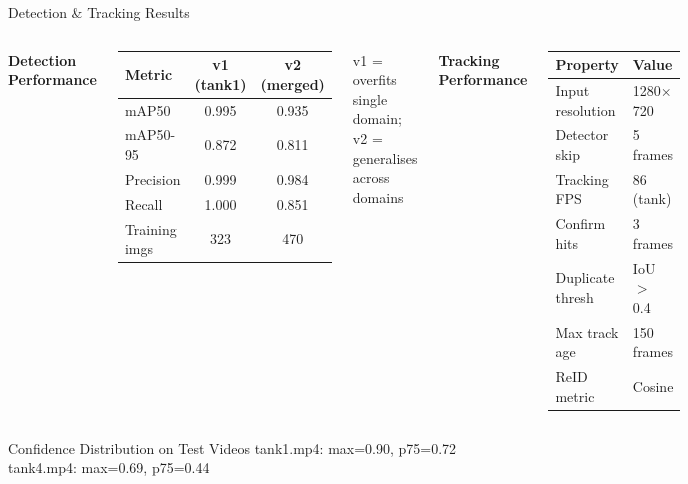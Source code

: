 \documentclass[aspectratio=169]{beamer}
\begin{document}
\begin{frame}{Detection \& Tracking Results}
\begin{columns}[T]
\textbf{Detection Performance}
\begin{center}
\small
\begin{tabular}{lcc}
\toprule
Metric      & v1 (tank1) & v2 (merged) \\
\midrule
mAP50       & 0.995      & 0.935 \\
mAP50-95    & 0.872      & 0.811 \\
Precision   & 0.999      & 0.984 \\
Recall      & 1.000      & 0.851 \\
\midrule
Training imgs & 323      & 470   \\
\bottomrule
\end{tabular}
\end{center}
\small v1 = overfits single domain; v2 = generalises across domains

\textbf{Tracking Performance}
\begin{center}
\small
\begin{tabular}{ll}
\toprule
Property          & Value \\
\midrule
Input resolution  & 1280$\times$720 \\
Detector skip     & 5 frames \\
Tracking FPS      & 86 (tank) \\
Confirm hits      & 3 frames \\
Duplicate thresh  & IoU $>$ 0.4 \\
Max track age     & 150 frames \\
ReID metric       & Cosine \\
\bottomrule
\end{tabular}
\end{center}
\end{columns}

\vspace{0.3cm}
\begin{exampleblock}{Confidence Distribution on Test Videos}
\small tank1.mp4: max=0.90, p75=0.72 \quad
       tank4.mp4: max=0.69, p75=0.44
\end{exampleblock}
\end{frame}
\end{document}
